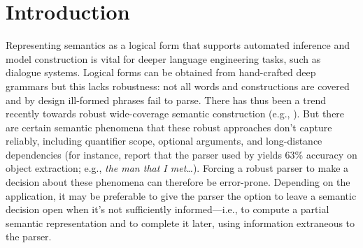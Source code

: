 \section{Introduction} \label{sec:intro}

Representing semantics as a logical form that supports automated
inference and model construction is vital for deeper language
engineering tasks, such as dialogue systems.  Logical forms
can be obtained from hand-crafted deep grammars
\cite{butt:etal:1999,copestake:flickinger:2000} but 
this lacks robustness: not all
words and constructions are covered and by design
ill-formed phrases fail to parse. 
There has thus been a trend recently towards
robust wide-coverage semantic construction (e.g., 
\cite{bos:etal:2004,zettlemoyer:collins:2007}).     
% 
But there are certain semantic phenomena that these robust
approaches don't capture reliably, including quantifier scope,
optional arguments, and long-distance dependencies (for instance,
 report that the parser used by
 yields 63\% accuracy on object
extraction; e.g., {\em the man that I met\dots}).  Forcing a robust
parser to make a decision about these phenomena can therefore be
error-prone.  Depending on the application, it may be preferable to
give the parser the option to leave a semantic decision open when it's not
sufficiently informed---i.e., to compute a partial semantic
representation and to complete it later, using information
extraneous to the parser.

